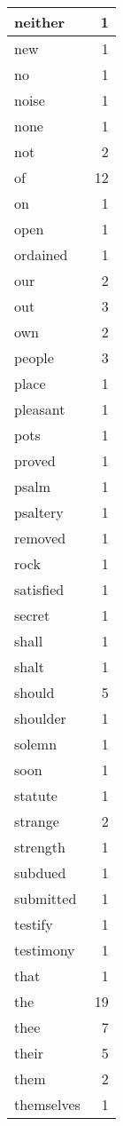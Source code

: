\begin{center}
\begin{longtable}{l|r}
neither & 1 \\ \hline
new & 1 \\ \hline
no & 1 \\ \hline
noise & 1 \\ \hline
none & 1 \\ \hline
not & 2 \\ \hline
of & 12 \\ \hline
on & 1 \\ \hline
open & 1 \\ \hline
ordained & 1 \\ \hline
our & 2 \\ \hline
out & 3 \\ \hline
own & 2 \\ \hline
people & 3 \\ \hline
place & 1 \\ \hline
pleasant & 1 \\ \hline
pots & 1 \\ \hline
proved & 1 \\ \hline
psalm & 1 \\ \hline
psaltery & 1 \\ \hline
removed & 1 \\ \hline
rock & 1 \\ \hline
satisfied & 1 \\ \hline
secret & 1 \\ \hline
shall & 1 \\ \hline
shalt & 1 \\ \hline
should & 5 \\ \hline
shoulder & 1 \\ \hline
solemn & 1 \\ \hline
soon & 1 \\ \hline
statute & 1 \\ \hline
strange & 2 \\ \hline
strength & 1 \\ \hline
subdued & 1 \\ \hline
submitted & 1 \\ \hline
testify & 1 \\ \hline
testimony & 1 \\ \hline
that & 1 \\ \hline
the & 19 \\ \hline
thee & 7 \\ \hline
their & 5 \\ \hline
them & 2 \\ \hline
themselves & 1 \\ \hline

\end{longtable}
\end{center}
